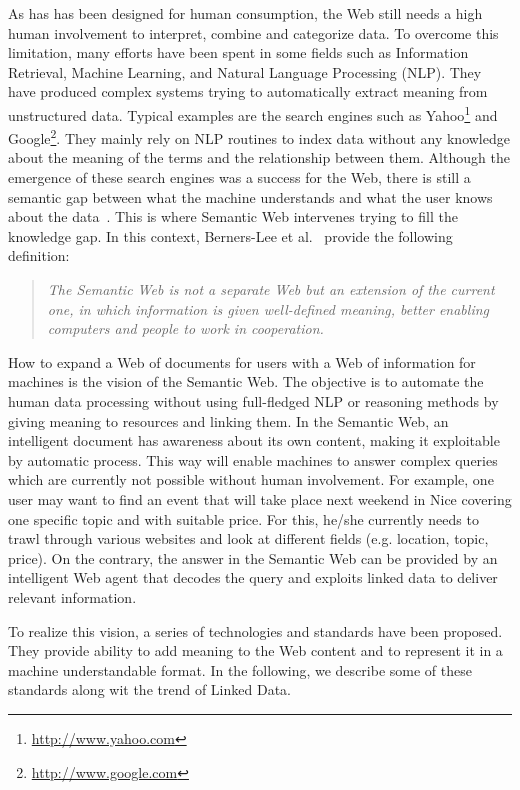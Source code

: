 As has has been designed for human consumption, the Web still needs a high human involvement to interpret, combine and categorize data. To overcome this limitation, many efforts have been spent in some fields such as Information Retrieval, Machine Learning, and Natural Language Processing (NLP). They have produced complex systems trying to automatically extract meaning from unstructured data. Typical examples are the search engines such as Yahoo\footnote{\url{http://www.yahoo.com}} and Google\footnote{\url{http://www.google.com}}. They mainly rely on NLP routines to index data without any knowledge about the meaning of the terms and the relationship between them. Although the emergence of these search engines was a success for the Web, there is still a semantic gap between what the machine understands and what the user knows about the data~\cite{Mika:07}. This is where Semantic Web intervenes trying to fill the knowledge gap. In this context, Berners-Lee et al.~\cite{BernersLee:01} provide the following definition:

\begin{quote}
\emph{The Semantic Web is not a separate Web but an extension of the current one, in which information is given well-defined meaning, better enabling computers and people to work in cooperation.}
\end{quote}

How to expand a Web of documents for users with a Web of information for machines is the vision of the Semantic Web. The objective is to automate the human data processing without using full-fledged NLP or reasoning methods by giving meaning to resources and linking them. In the Semantic Web, an intelligent document has awareness about its own content, making it exploitable by automatic process. This way will enable machines to answer complex queries which are currently not possible without human involvement. For example, one user may want to find an event that will take place next weekend in Nice covering one specific topic and with suitable price. For this, he/she currently needs to trawl through various websites and look at different fields (e.g. location, topic, price). On the contrary, the answer in the Semantic Web can be provided by an intelligent Web agent that decodes the query and exploits linked data to deliver relevant information.

To realize this vision, a series of technologies and standards have been proposed. They provide ability to add meaning to the Web content and to represent it in a machine understandable format. In the following, we describe some of these standards along wit the trend of Linked Data.

